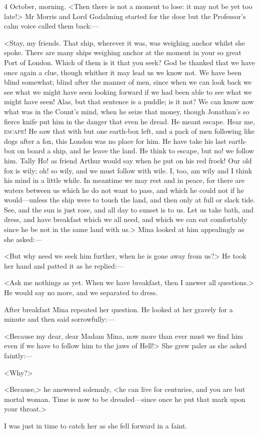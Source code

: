 \begin{diary}{4 October, morning.}
<Then there is not a moment to lose: it may not be yet too late!> Mr Morris and Lord Godalming started for the door but the Professor's calm voice called them back:—

<Stay, my friends. That ship, wherever it was, was weighing anchor whilst she spoke. There are many ships weighing anchor at the moment in your so great Port of London. Which of them is it that you seek? God be thanked that we have once again a clue, though whither it may lead us we know not. We have been blind somewhat; blind after the manner of men, since when we can look back we see what we might have seen looking forward if we had been able to see what we might have seen! Alas, but that sentence is a puddle; is it not? We can know now what was in the Count's mind, when he seize that money, though Jonathan's so fierce knife put him in the danger that even he dread. He meant escape. Hear me, \textsc{escape}! He saw that with but one earth-box left, and a pack of men following like dogs after a fox, this London was no place for him. He have take his last earth-box on board a ship, and he leave the land. He think to escape, but no! we follow him. Tally Ho! as friend Arthur would say when he put on his red frock! Our old fox is wily; oh! so wily, and we must follow with wile. I, too, am wily and I think his mind in a little while. In meantime we may rest and in peace, for there are waters between us which he do not want to pass, and which he could not if he would—unless the ship were to touch the land, and then only at full or slack tide. See, and the sun is just rose, and all day to sunset is to us. Let us take bath, and dress, and have breakfast which we all need, and which we can eat comfortably since he be not in the same land with us.> Mina looked at him appealingly as she asked:—

<But why need we seek him further, when he is gone away from us?> He took her hand and patted it as he replied:—

<Ask me nothings as yet. When we have breakfast, then I answer all questions.> He would say no more, and we separated to dress.

After breakfast Mina repeated her question. He looked at her gravely for a minute and then said sorrowfully:—

<Because my dear, dear Madam Mina, now more than ever must we find him even if we have to follow him to the jaws of Hell!> She grew paler as she asked faintly:—

<Why?>

<Because,> he answered solemnly, <he can live for centuries, and you are but mortal woman. Time is now to be dreaded—since once he put that mark upon your throat.>

I was just in time to catch her as she fell forward in a faint.
\end{diary}
